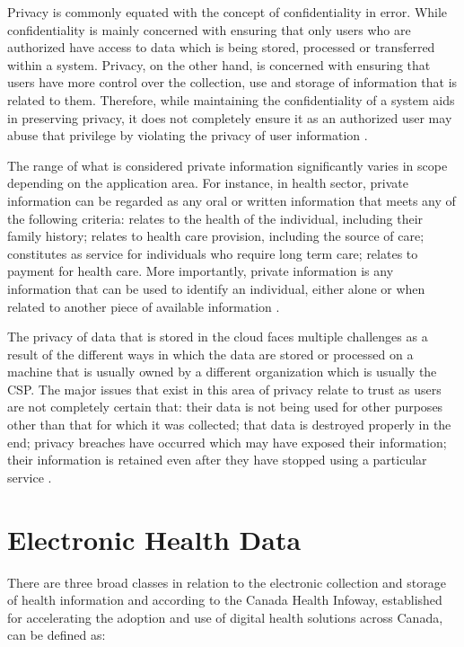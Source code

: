Privacy is commonly equated with the concept of confidentiality in error. While confidentiality is mainly concerned with ensuring that only users who are authorized have access to data which is being stored, processed or transferred within a system. Privacy, on the other hand, is concerned with ensuring that users have more control over the collection, use and storage of information that is related to them. Therefore, while maintaining the confidentiality of a system aids in preserving privacy, it does not completely ensure it as an authorized user may abuse that privilege by violating the privacy of user information \cite{pearsonprivacy}.

The range of what is considered private information significantly varies in scope depending on the application area. For instance, in health sector, private information can be regarded as any oral or written information that meets any of the following criteria: relates to the health of the individual, including their family history; relates to health care provision, including the source of care; constitutes as service for individuals who require long term care; relates to payment for health care. More importantly, private information is any information that can be used to identify an individual, either alone or when related to another piece of available information \cite{annpia}.

The privacy of data that is stored in the cloud faces multiple challenges as a result of the different ways in which the data are stored or processed on a machine that is usually owned by a different organization which is usually the CSP. The major issues that exist in this area of privacy relate to trust as users are not completely certain that: their data is not being used for other purposes other than that for which it was collected; that data is destroyed properly in the end; privacy breaches have occurred which may have exposed their information; their information is retained even after they have stopped using a particular service \cite{pearsonprivacy}.

\section{Electronic Health Data}

There are three broad classes in relation to the electronic collection and storage of health information and according to the Canada Health Infoway, established for accelerating the adoption and use of digital health solutions across Canada, can be defined as:

